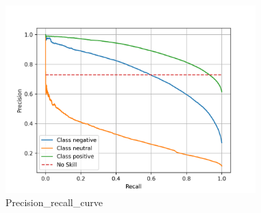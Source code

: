 \documentclass{article}%
\begin{document}
{%
\newpage%
\raggedright%


\begin{figure}[h!]%
\centering%
\includegraphics[width=365px]{./report/Learning/Logistic_Regression/Recall-Precision.png}%
\caption{Precision\_recall\_curve}%
\end{figure}

%
}%
\pagestyle{firstpage}%
\newpage%
\end{document}

